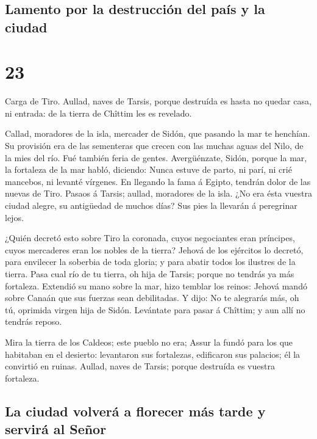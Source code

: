 \hypertarget{lamento-por-la-destrucciuxf3n-del-pauxeds-y-la-ciudad}{%
\subsection{Lamento por la destrucción del país y la
ciudad}\label{lamento-por-la-destrucciuxf3n-del-pauxeds-y-la-ciudad}}

\hypertarget{section-22}{%
\section{23}\label{section-22}}

 Carga de Tiro. Aullad, naves de Tarsis, porque destruída es
hasta no quedar casa, ni entrada: de la tierra de Chîttim les es
revelado.

 Callad, moradores de la isla, mercader de Sidón, que
pasando la mar te henchían.  Su provisión era de las
sementeras que crecen con las muchas aguas del Nilo, de la mies del río.
Fué también feria de gentes.  Avergüénzate, Sidón, porque la
mar, la fortaleza de la mar habló, diciendo: Nunca estuve de parto, ni
parí, ni crié mancebos, ni levanté vírgenes.  En llegando la
fama á Egipto, tendrán dolor de las nuevas de Tiro.  Pasaos
á Tarsis; aullad, moradores de la isla.  ¿No era ésta
vuestra ciudad alegre, su antigüedad de muchos días? Sus pies la
llevarán á peregrinar lejos.

 ¿Quién decretó esto sobre Tiro la coronada, cuyos
negociantes eran príncipes, cuyos mercaderes eran los nobles de la
tierra?  Jehová de los ejércitos lo decretó, para envilecer
la soberbia de toda gloria; y para abatir todos los ilustres de la
tierra.  Pasa cual río de tu tierra, oh hija de Tarsis;
porque no tendrás ya más fortaleza.  Extendió su mano sobre
la mar, hizo temblar los reinos: Jehová mandó sobre Canaán que sus
fuerzas sean debilitadas.  Y dijo: No te alegrarás más, oh
tú, oprimida virgen hija de Sidón. Levántate para pasar á Chîttim; y aun
allí no tendrás reposo.

 Mira la tierra de los Caldeos; este pueblo no era; Assur
la fundó para los que habitaban en el desierto: levantaron sus
fortalezas, edificaron sus palacios; él la convirtió en ruinas.
 Aullad, naves de Tarsis; porque destruída es vuestra
fortaleza.

\hypertarget{la-ciudad-volveruxe1-a-florecer-muxe1s-tarde-y-serviruxe1-al-seuxf1or}{%
\subsection{La ciudad volverá a florecer más tarde y servirá al
Señor}\label{la-ciudad-volveruxe1-a-florecer-muxe1s-tarde-y-serviruxe1-al-seuxf1or}}

